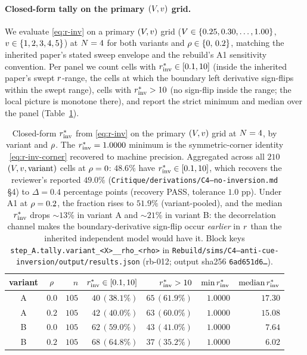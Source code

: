 \paragraph{Closed-form tally on the primary $(V, v)$ grid.}
We evaluate \eqref{eq:r-inv} on a primary $(V, v)$ grid
($V \in \{0.25, 0.30, \ldots, 1.00\}$, $v \in \{1, 2, 3, 4,
5\}$) at $N = 4$ for both variants and $\rho \in \{0,\, 0.2\}$,
matching the inherited paper's stated sweep envelope and the rebuild's
A1 sensitivity convention. Per panel we count cells with $r^{*}_{\mathrm{inv}}
\in [0.1, 10]$ (inside the inherited paper's swept $r$-range,
the cells at which the boundary left derivative sign-flips within
the swept range), cells with $r^{*}_{\mathrm{inv}} > 10$ (no sign-flip inside
the range; the local picture is monotone there), and report the
strict minimum and median over the panel
(Table~\ref{tab:c4-rstar-tally}).
%
\begin{table}[t]
  \centering
  \small
  \begin{tabular}{c c r r r r r}
    \toprule
    variant & $\rho$ & $n$ & $r^{*}_{\mathrm{inv}} \in [0.1, 10]$ &
    $r^{*}_{\mathrm{inv}} > 10$ & $\min r^{*}_{\mathrm{inv}}$ & $\mathrm{median}\,r^{*}_{\mathrm{inv}}$ \\
    \midrule
    A & $0.0$ & $105$ & $40\,(38.1\%)$ & $65\,(61.9\%)$ &
              $1.0000$ & $17.30$ \\
    A & $0.2$ & $105$ & $42\,(40.0\%)$ & $63\,(60.0\%)$ &
              $1.0000$ & $15.08$ \\
    B & $0.0$ & $105$ & $62\,(59.0\%)$ & $43\,(41.0\%)$ &
              $1.0000$ & $\phantom{0}7.64$ \\
    B & $0.2$ & $105$ & $68\,(64.8\%)$ & $37\,(35.2\%)$ &
              $1.0000$ & $\phantom{0}6.02$ \\
    \bottomrule
  \end{tabular}
  \caption{Closed-form $r^{*}_{\mathrm{inv}}$ from \eqref{eq:r-inv} on the
  primary $(V, v)$ grid at $N = 4$, by variant and
  $\rho$. The $r^{*}_{\mathrm{inv}} = 1.0000$ minimum is the
  symmetric-corner identity \eqref{eq:r-inv-corner} recovered to
  machine precision. Aggregated across all $210$ $(V, v,
  \text{variant})$ cells at $\rho = 0$: $\mathbf{48.6\%}$ have
  $r^{*}_{\mathrm{inv}} \in [0.1, 10]$, which recovers the reviewer's reported
  $49.0\%$ (\texttt{Critique/derivations/C4--no-inversion.md} §4)
  to $\Delta = 0.4$ percentage points (recovery PASS, tolerance
  $1.0$ pp). Under A1 at $\rho = 0.2$, the fraction
  rises to $51.9\%$ (variant-pooled), and the median $r^{*}_{\mathrm{inv}}$ drops
  $\sim$$13\%$ in variant A and $\sim$$21\%$ in variant B: the
  decorrelation channel makes the boundary-derivative sign-flip
  occur \emph{earlier} in $r$ than the inherited independent
  model would have it. Block keys
  \texttt{step\_A.tally.variant\_<X>\_\_rho\_<rho>} in
  \texttt{Rebuild/sims/C4--anti-cue-inversion/output/results.json}
  (rb-012; output sha256 \texttt{6ad651d6\ldots}).}
  \label{tab:c4-rstar-tally}
\end{table}

